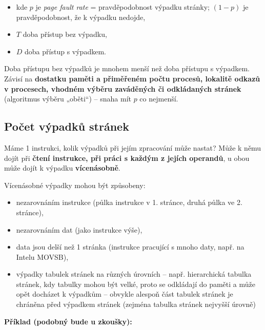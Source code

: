 \documentclass[a4paper, 11pt]{article}
\begin{document}
\begin{itemize}
    \item kde $p$ je \emph{page fault rate} = pravděpodobnost výpadku stránky; $(1 - p)$ je pravděpodobnost, že k výpadku nedojde,
    \item $T$ doba přístup bez výpadku,
    \item $D$ doba přístup s výpadkem.
\end{itemize}

Doba přístupu bez výpadků je mnohem menší než doba přístupu s výpadkem. Závisí na \textbf{dostatku paměti a přiměřeném počtu procesů, lokalitě odkazů v procesech, vhodném výběru zaváděných či odkládaných stránek} (algoritmus výběru „oběti“) -- snaha mít $p$ co nejmenší.

\subsection{Počet výpadků stránek}
Máme 1 instrukci, kolik výpadků při jejím zpracování může nastat? Může k němu dojít při \textbf{čtení instrukce, při práci s každým z jejích operandů}, u obou může dojít k výpadku \textbf{vícenásobně}.
 
Vícenásobné výpadky mohou být způsobeny:
\begin{itemize}
    \item nezarovnáním instrukce (půlka instrukce v 1. stránce, druhá půlka ve 2. stránce),
    \item nezarovnáním dat (jako instrukce výše),
    \item data jsou delší než 1 stránka (instrukce pracující s mnoho daty, např. na Intelu MOVSB),
    \item výpadky tabulek stránek na různých úrovních -- např. hierarchická tabulka stránek, kdy tabulky mohou být velké, proto se odkládají do paměti a může opět docházet k výpadkům -- obvykle alespoň část tabulek stránek je chráněna před výpadkem stránek (zejména tabulka stránek nejvyšší úrovně)
\end{itemize}

\textbf{Příklad (podobný bude u zkoušky):}
\end{document}
